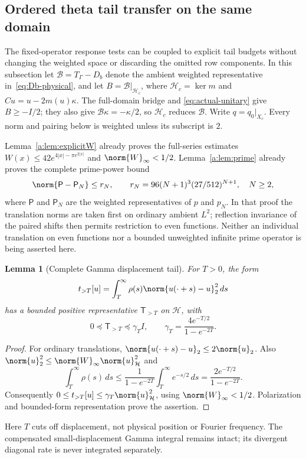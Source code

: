 \documentclass[11pt,a4paper]{article}
\numberwithin{equation}{section}
\newtheorem{lemma}[theorem]{Lemma}
\theoremstyle{definition}\newtheorem{definition}[theorem]{Definition}
\theoremstyle{remark}\newtheorem{remark}[theorem]{Remark}
\newcommand{\Hh}{\mathcal H}\newcommand{\Hw}{\mathcal H}
\begin{document}
\subsection{Ordered theta tail transfer on the same domain}
\label{rtc:tail-section}

The fixed-operator response tests can be coupled to explicit tail budgets
without changing the weighted space or discarding the omitted row components.
In this subsection let $\mathcal B=T_\Gamma-D_b$ denote the ambient
weighted representative in~\eqref{eq:Db-physical}, and let
$B=\mathcal B|_{\Hh_c}$, where $\Hh_c=\ker m$ and
$Cu=u-2m(u)\kappa$.  The full-domain bridge and
\eqref{eq:actual-unitary} give $B\ge-I/2$; they also give
$\mathcal B\kappa=-\kappa/2$, so $\Hh_c$ reduces $\mathcal B$.
Write $q=q_0|_{X_c}$.  Every norm and pairing below is weighted unless
its subscript is $2$.

Lemma~\ref{a:lem:explicitW} already proves the full-series estimates
$W(x)\le42e^{4|x|-\pi e^{2|x|}}$ and $\norm{W}_\infty<1/2$.
Lemma~\ref{a:lem:prime} already proves the complete prime-power bound
\begin{equation}\label{rtc:tail-prime-budget}
 \norm{\mathsf P-\mathsf P_N}\le r_N,
 \qquad r_N=96(N+1)^3(27/512)^{N+1},\quad N\ge2,
\end{equation}
where $\mathsf P$ and $\mathsf P_N$ are the weighted representatives
of $p$ and $p_N$.  In that proof the translation norms are taken first
on ordinary ambient $L^2$; reflection invariance of the paired shifts
then permits restriction to even functions.  Neither an individual
translation on even functions nor a bounded unweighted infinite prime
operator is being asserted here.

\begin{lemma}[Complete Gamma displacement tail]\label{rtc:tail-gamma}
For $T>0$, the form
\[
 t_{>T}[u]=\int_T^\infty\rho(s)
               \norm{u(\cdot+s)-u}_2^2\,ds
\]
has a bounded positive representative $\mathsf T_{>T}$ on $\Hh$, with
\begin{equation}\label{rtc:tail-gamma-budget}
 0\preceq\mathsf T_{>T}\preceq\gamma_T I,
 \qquad \gamma_T=\frac{4e^{-T/2}}{1-e^{-2T}}.
\end{equation}
\end{lemma}
\begin{proof}
For ordinary translations, $\norm{u(\cdot+s)-u}_2\le2\norm{u}_2$.
Also $\norm{u}_2^2\le\norm{W}_\infty\norm{u}_{\Hh}^2$ and
\[
 \int_T^\infty\rho(s)\,ds
 \le\frac{1}{1-e^{-2T}}\int_T^\infty e^{-s/2}\,ds
 =\frac{2e^{-T/2}}{1-e^{-2T}}.
\]
Consequently $0\le t_{>T}[u]\le\gamma_T\norm{u}_{\Hh}^2$,
using $\norm{W}_\infty<1/2$.  Polarization and bounded-form
representation prove the assertion.
\end{proof}
Here $T$ cuts off displacement, not physical position or Fourier
frequency.  The compensated small-displacement Gamma integral remains
intact; its divergent diagonal rate is never integrated separately.
\end{document}
